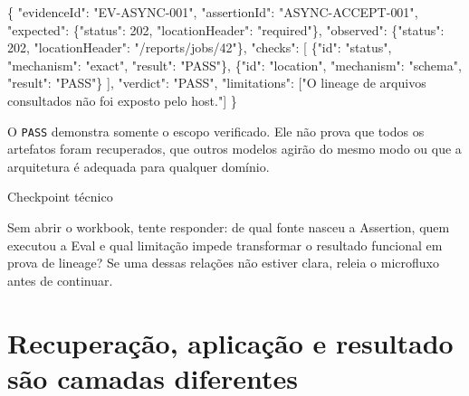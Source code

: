 \documentclass[
  10pt,
  a4paper,
  oneside]{book}
\newenvironment{Shaded}{}{}
\newcommand{\DataTypeTok}[1]{\textcolor[rgb]{0.56,0.13,0.00}{#1}}
\newcommand{\DecValTok}[1]{\textcolor[rgb]{0.25,0.63,0.44}{#1}}
\newcommand{\FunctionTok}[1]{\textcolor[rgb]{0.02,0.16,0.49}{#1}}
\newcommand{\OtherTok}[1]{\textcolor[rgb]{0.00,0.44,0.13}{#1}}
\newcommand{\StringTok}[1]{\textcolor[rgb]{0.25,0.44,0.63}{#1}}
\renewenvironment{Shaded}{\begin{snugshade}}{\end{snugshade}}%
\begin{document}
\begin{Shaded}
\begin{Highlighting}[]
\FunctionTok{\{}
  \DataTypeTok{"evidenceId"}\FunctionTok{:} \StringTok{"EV{-}ASYNC{-}001"}\FunctionTok{,}
  \DataTypeTok{"assertionId"}\FunctionTok{:} \StringTok{"ASYNC{-}ACCEPT{-}001"}\FunctionTok{,}
  \DataTypeTok{"expected"}\FunctionTok{:} \FunctionTok{\{}\DataTypeTok{"status"}\FunctionTok{:} \DecValTok{202}\FunctionTok{,} \DataTypeTok{"locationHeader"}\FunctionTok{:} \StringTok{"required"}\FunctionTok{\},}
  \DataTypeTok{"observed"}\FunctionTok{:} \FunctionTok{\{}\DataTypeTok{"status"}\FunctionTok{:} \DecValTok{202}\FunctionTok{,} \DataTypeTok{"locationHeader"}\FunctionTok{:} \StringTok{"/reports/jobs/42"}\FunctionTok{\},}
  \DataTypeTok{"checks"}\FunctionTok{:} \OtherTok{[}
    \FunctionTok{\{}\DataTypeTok{"id"}\FunctionTok{:} \StringTok{"status"}\FunctionTok{,} \DataTypeTok{"mechanism"}\FunctionTok{:} \StringTok{"exact"}\FunctionTok{,} \DataTypeTok{"result"}\FunctionTok{:} \StringTok{"PASS"}\FunctionTok{\}}\OtherTok{,}
    \FunctionTok{\{}\DataTypeTok{"id"}\FunctionTok{:} \StringTok{"location"}\FunctionTok{,} \DataTypeTok{"mechanism"}\FunctionTok{:} \StringTok{"schema"}\FunctionTok{,} \DataTypeTok{"result"}\FunctionTok{:} \StringTok{"PASS"}\FunctionTok{\}}
  \OtherTok{]}\FunctionTok{,}
  \DataTypeTok{"verdict"}\FunctionTok{:} \StringTok{"PASS"}\FunctionTok{,}
  \DataTypeTok{"limitations"}\FunctionTok{:} \OtherTok{[}\StringTok{"O lineage de arquivos consultados não foi exposto pelo host."}\OtherTok{]}
\FunctionTok{\}}
\end{Highlighting}
\end{Shaded}

O \texttt{PASS} demonstra somente o escopo verificado. Ele não prova que
todos os artefatos foram recuperados, que outros modelos agirão do mesmo
modo ou que a arquitetura é adequada para qualquer domínio.

\begin{examplebox}{Checkpoint técnico}

Sem abrir o workbook, tente responder: de qual fonte nasceu a Assertion,
quem executou a Eval e qual limitação impede transformar o resultado
funcional em prova de lineage? Se uma dessas relações não estiver clara,
releia o microfluxo antes de continuar.

\end{examplebox}

\hypertarget{recuperauxe7uxe3o-aplicauxe7uxe3o-e-resultado-suxe3o-camadas-diferentes}{%
\section{Recuperação, aplicação e resultado são camadas
diferentes}\label{recuperauxe7uxe3o-aplicauxe7uxe3o-e-resultado-suxe3o-camadas-diferentes}}
\end{document}
